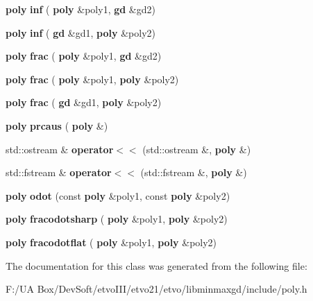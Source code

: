 \begin{DoxyCompactItemize}
\item 
\mbox{\label{classmmgd_1_1poly_a03fcc1a1d0999a26f741958726ad8786}} 
\textbf{ poly} {\bfseries inf} (\textbf{ poly} \&poly1, \textbf{ gd} \&gd2)
\item 
\mbox{\label{classmmgd_1_1poly_a201336586d8f06607e606a71d56d0620}} 
\textbf{ poly} {\bfseries inf} (\textbf{ gd} \&gd1, \textbf{ poly} \&poly2)
\item 
\mbox{\label{classmmgd_1_1poly_a1ca2365b15ec5d9647e2ee8cc82bc0c3}} 
\textbf{ poly} {\bfseries frac} (\textbf{ poly} \&poly1, \textbf{ gd} \&gd2)
\item 
\mbox{\label{classmmgd_1_1poly_a2bb496ce83846bee4b6273821e059827}} 
\textbf{ poly} {\bfseries frac} (\textbf{ poly} \&poly1, \textbf{ poly} \&poly2)
\item 
\mbox{\label{classmmgd_1_1poly_af8dd7f52f6fa54f4f40d657652b14a54}} 
\textbf{ poly} {\bfseries frac} (\textbf{ gd} \&gd1, \textbf{ poly} \&poly2)
\item 
\mbox{\label{classmmgd_1_1poly_ad9580516418e4c9c5ee22b7f67cfb6ee}} 
\textbf{ poly} {\bfseries prcaus} (\textbf{ poly} \&)
\item 
\mbox{\label{classmmgd_1_1poly_a0361c355a8ea5d7e13ec20144390082f}} 
std\+::ostream \& {\bfseries operator$<$$<$} (std\+::ostream \&, \textbf{ poly} \&)
\item 
\mbox{\label{classmmgd_1_1poly_af0ab9a74b034ed507c6070d9a47951b8}} 
std\+::fstream \& {\bfseries operator$<$$<$} (std\+::fstream \&, \textbf{ poly} \&)
\item 
\mbox{\label{classmmgd_1_1poly_a9cecbf55fe370b38e24b8b639fd1ee03}} 
\textbf{ poly} {\bfseries odot} (const \textbf{ poly} \&poly1, const \textbf{ poly} \&poly2)
\item 
\mbox{\label{classmmgd_1_1poly_aff323f3e36b51b89ff4b52ffdf7464dd}} 
\textbf{ poly} {\bfseries fracodotsharp} (\textbf{ poly} \&poly1, \textbf{ poly} \&poly2)
\item 
\mbox{\label{classmmgd_1_1poly_ad284d1dbb550ed9c6a6ad3f9f3e2e3cc}} 
\textbf{ poly} {\bfseries fracodotflat} (\textbf{ poly} \&poly1, \textbf{ poly} \&poly2)
\end{DoxyCompactItemize}


The documentation for this class was generated from the following file\+:\begin{DoxyCompactItemize}
\item 
F\+:/\+U\+A Box/\+Dev\+Soft/etvo\+I\+I\+I/etvo21/etvo/libminmaxgd/include/poly.\+h\end{DoxyCompactItemize}
